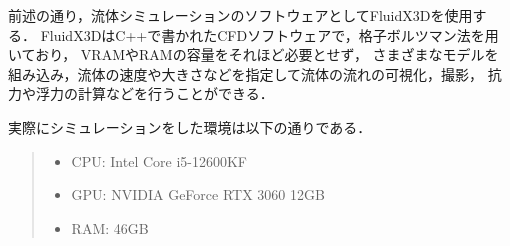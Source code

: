 
前述の通り，流体シミュレーションのソフトウェアとしてFluidX3Dを使用する．
FluidX3DはC++で書かれたCFDソフトウェアで，格子ボルツマン法を用いており，
VRAMやRAMの容量をそれほど必要とせず，
さまざまなモデルを組み込み，流体の速度や大きさなどを指定して流体の流れの可視化，撮影，
抗力や浮力の計算などを行うことができる．

実際にシミュレーションをした環境は以下の通りである．

\begin{quote}
    \begin{itemize}
        \item CPU: Intel Core i5-12600KF
        \item GPU: NVIDIA GeForce RTX 3060 12GB
        \item RAM: 46GB
    \end{itemize}
\end{quote}